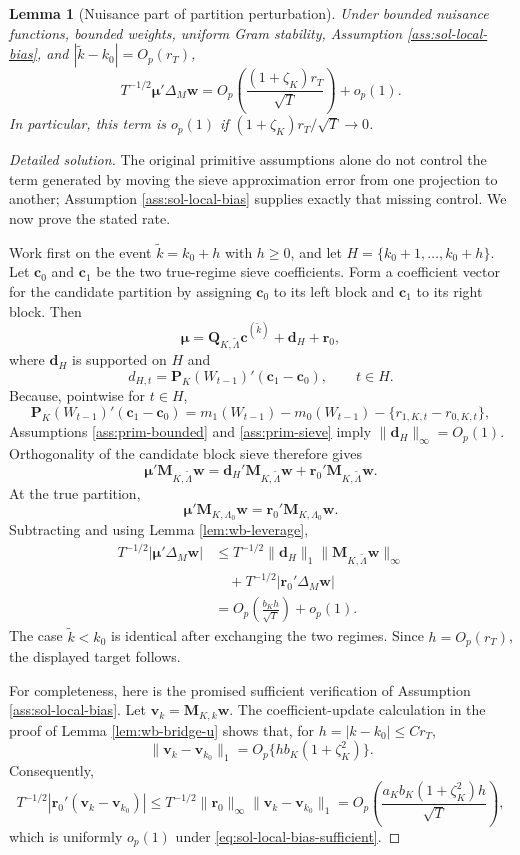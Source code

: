 \documentclass[12pt]{article}
\numberwithin{equation}{section}
\newtheorem{lemma}{Lemma}
\theoremstyle{definition}
\begin{document}
\begin{lemma}[Nuisance part of partition perturbation]
\label{lem:wb-bridge-mu}
Under bounded nuisance functions, bounded weights, uniform Gram stability,
Assumption \ref{ass:sol-local-bias}, and
\(|\widetilde k-k_0|=O_p(r_T)\),
\[
    T^{-1/2}\bm\mu'\Delta_M\bm w
    =
    O_p\!\left(\frac{(1+\zeta_K)r_T}{\sqrt T}\right)+o_p(1).
\]
In particular, this term is \(o_p(1)\) if \((1+\zeta_K)r_T/\sqrt T\to0\).
\end{lemma}


\begin{proof}[Detailed solution]
The original primitive assumptions alone do not control the term generated
by moving the sieve approximation error from one projection to another;
Assumption \ref{ass:sol-local-bias} supplies exactly that missing control.
We now prove the stated rate.

Work first on the event \(\widetilde k=k_0+h\) with \(h\geq0\), and let
\(H=\{k_0+1,\ldots,k_0+h\}\).  Let \(\bm c_0\) and \(\bm c_1\) be the two
true-regime sieve coefficients.  Form a coefficient vector for the candidate
partition by assigning \(\bm c_0\) to its left block and \(\bm c_1\) to its
right block.  Then
\[
    \bm\mu=\bm Q_{K,\widetilde\Lambda}\bm c^{(\widetilde k)}
            +\bm d_H+\bm r_0,
\]
where \(\bm d_H\) is supported on \(H\) and
\[
    d_{H,t}=\bm P_K(W_{t-1})'(\bm c_1-\bm c_0),
    \qquad t\in H.
\]
Because, pointwise for \(t\in H\),
\[
    \bm P_K(W_{t-1})'(\bm c_1-\bm c_0)
    =m_1(W_{t-1})-m_0(W_{t-1})
      -\{r_{1,K,t}-r_{0,K,t}\},
\]
Assumptions \ref{ass:prim-bounded} and \ref{ass:prim-sieve} imply
\(\|\bm d_H\|_\infty=O_p(1)\).  Orthogonality of the candidate block sieve
therefore gives
\[
    \bm\mu'\bm M_{K,\widetilde\Lambda}\bm w
    =\bm d_H'\bm M_{K,\widetilde\Lambda}\bm w
      +\bm r_0'\bm M_{K,\widetilde\Lambda}\bm w.
\]
At the true partition,
\[
    \bm\mu'\bm M_{K,\Lambda_0}\bm w
    =\bm r_0'\bm M_{K,\Lambda_0}\bm w.
\]
Subtracting and using Lemma \ref{lem:wb-leverage},
\begin{align*}
    T^{-1/2}|\bm\mu'\Delta_M\bm w|
    &\leq
      T^{-1/2}\|\bm d_H\|_1
      \|\bm M_{K,\widetilde\Lambda}\bm w\|_\infty\\
    &\quad+
      T^{-1/2}|\bm r_0'\Delta_M\bm w|\\
    &=O_p\left(\frac{b_Kh}{\sqrt T}\right)+o_p(1).
\end{align*}
The case \(\widetilde k<k_0\) is identical after exchanging the two regimes.
Since \(h=O_p(r_T)\), the displayed target follows.

For completeness, here is the promised sufficient verification of
Assumption \ref{ass:sol-local-bias}.  Let
\(\bm v_k=\bm M_{K,k}\bm w\).  The coefficient-update calculation in the
proof of Lemma \ref{lem:wb-bridge-u} shows that, for
\(h=|k-k_0|\leq Cr_T\),
\[
    \|\bm v_k-\bm v_{k_0}\|_1
    =O_p\{h b_K(1+\zeta_K^2)\}.
\]
Consequently,
\[
    T^{-1/2}|\bm r_0'(\bm v_k-\bm v_{k_0})|
    \leq
    T^{-1/2}\|\bm r_0\|_\infty
               \|\bm v_k-\bm v_{k_0}\|_1
    =O_p\left(
       \frac{a_Kb_K(1+\zeta_K^2)h}{\sqrt T}
      \right),
\]
which is uniformly \(o_p(1)\) under
\eqref{eq:sol-local-bias-sufficient}.
\end{proof}
\end{document}
